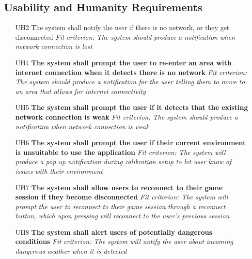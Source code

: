 \documentclass{article}
\begin{document}
\subsection{Usability and Humanity Requirements}
\begin{enumerate}
    \item[UH2] The system shall notify the user if there is no network, or they get disconnected\newline
    \textit{Fit criterion: The system should produce a notification when network connection is lost}
    \item[UH4] \textbf{The system shall prompt the user to re-enter an area with internet connection when it detects there is no network}\newline
    \textit{Fit criterion: The system should produce a notification for the user telling them to move to an area that allows for internet connectivity}
    \item[UH5] \textbf{The system shall prompt the user if it detects that the existing network connection is weak}\newline
    \textit{Fit criterion: The system should produce a notification when network connection is weak}
    \item[UH6] \textbf{The system shall prompt the user if their current environment is unsuitable to use the application}\newline
    \textit{Fit criterion: The system will produce a pop up notification during calibration setup to let user know of issues with their environment}
    \item[UH7] \textbf{The system shall allow users to reconnect to their game session if they become disconnected}\newline
    \textit{Fit criterion: The system will prompt the user to reconnect to their game session through a reconnect button, which upon pressing will reconnect to the user's previous session}
    \item[UH8] \textbf{The system shall alert users of potentially dangerous conditions} \newline
    \textit{Fit criterion: The system will notify the user about incoming dangerous weather when it is detected}
\end{enumerate}

\end{document}
